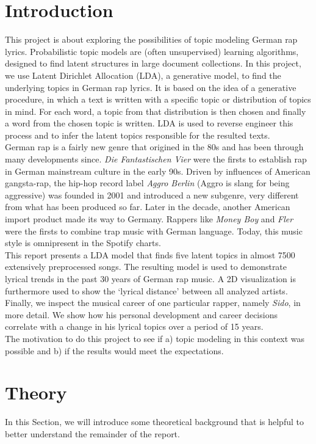 \documentclass[conference]{IEEEtran}
\begin{document}
\section{Introduction}
This project is about exploring the possibilities of topic modeling German rap lyrics. Probabilistic topic models are (often unsupervised) learning algorithms, designed to find latent structures in large document collections. In this project, we use Latent Dirichlet Allocation (LDA), a generative model, to find the underlying topics in German rap lyrics. It is based on the idea of a generative procedure, in which a text is written with a specific topic or distribution of topics in mind. For each word, a topic from that distribution is then chosen and finally a word from the chosen topic is written. LDA is used to reverse engineer this process and to infer the latent topics responsible for the resulted texts.\\
German rap is a fairly new genre that origined in the 80s and has been through many developments since. \textit{Die Fantastischen Vier} were the firsts to establish rap in German mainstream culture in the early 90s. Driven by influences of American gangsta-rap, the hip-hop record label \textit{Aggro Berlin} (Aggro is slang for being aggressive) was founded in 2001 and introduced a new subgenre, very different from what has been produced so far. Later in the decade, another American import product made its way to Germany. Rappers like \textit{Money Boy} and \textit{Fler} were the firsts to combine trap music with German language. Today, this music style is omnipresent in the Spotify charts.\\
This report presents a LDA model that finds five latent topics in almost 7500 extensively preprocessed songs. The resulting model is used to demonstrate lyrical trends in the past 30 years of German rap music. A 2D visualization is furthermore used to show the {\lq}lyrical distance{\rq} between all analyzed artists. Finally, we inspect the musical career of one particular rapper, namely \textit{Sido}, in more detail. We show how his personal development and career decisions correlate with a change in his lyrical topics over a period of 15 years.\\
The motivation to do this project to see if a) topic modeling in this context was possible and b) if the results would meet the expectations.

\section{Theory}
In this Section, we will introduce some theoretical background that is helpful to better understand the remainder of the report.
\end{document}
